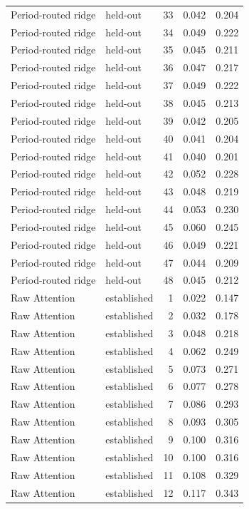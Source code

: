 \begin{tabular}{llrrr}
Period-routed ridge & held-out & 33 & 0.042 & 0.204 \\
Period-routed ridge & held-out & 34 & 0.049 & 0.222 \\
Period-routed ridge & held-out & 35 & 0.045 & 0.211 \\
Period-routed ridge & held-out & 36 & 0.047 & 0.217 \\
Period-routed ridge & held-out & 37 & 0.049 & 0.222 \\
Period-routed ridge & held-out & 38 & 0.045 & 0.213 \\
Period-routed ridge & held-out & 39 & 0.042 & 0.205 \\
Period-routed ridge & held-out & 40 & 0.041 & 0.204 \\
Period-routed ridge & held-out & 41 & 0.040 & 0.201 \\
Period-routed ridge & held-out & 42 & 0.052 & 0.228 \\
Period-routed ridge & held-out & 43 & 0.048 & 0.219 \\
Period-routed ridge & held-out & 44 & 0.053 & 0.230 \\
Period-routed ridge & held-out & 45 & 0.060 & 0.245 \\
Period-routed ridge & held-out & 46 & 0.049 & 0.221 \\
Period-routed ridge & held-out & 47 & 0.044 & 0.209 \\
Period-routed ridge & held-out & 48 & 0.045 & 0.212 \\
Raw Attention & established & 1 & 0.022 & 0.147 \\
Raw Attention & established & 2 & 0.032 & 0.178 \\
Raw Attention & established & 3 & 0.048 & 0.218 \\
Raw Attention & established & 4 & 0.062 & 0.249 \\
Raw Attention & established & 5 & 0.073 & 0.271 \\
Raw Attention & established & 6 & 0.077 & 0.278 \\
Raw Attention & established & 7 & 0.086 & 0.293 \\
Raw Attention & established & 8 & 0.093 & 0.305 \\
Raw Attention & established & 9 & 0.100 & 0.316 \\
Raw Attention & established & 10 & 0.100 & 0.316 \\
Raw Attention & established & 11 & 0.108 & 0.329 \\
Raw Attention & established & 12 & 0.117 & 0.343 \\

\end{tabular}
